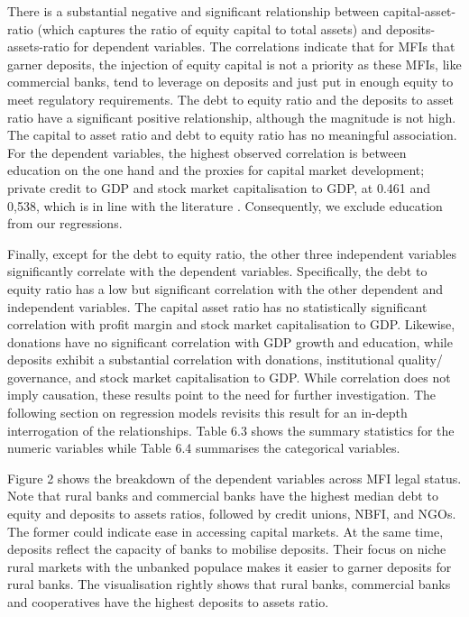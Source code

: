 \documentclass[a4paper, nobind]{templates/ociamthesis}
\begin{document}
There is a substantial negative and significant relationship between capital-asset-ratio (which captures the ratio of equity capital to total assets) and deposits-assets-ratio for dependent variables. The correlations indicate that for MFIs that garner deposits, the injection of equity capital is not a priority as these MFIs, like commercial banks, tend to leverage on deposits and just put in enough equity to meet regulatory requirements. The debt to equity ratio and the deposits to asset ratio have a significant positive relationship, although the magnitude is not high. The capital to asset ratio and debt to equity ratio has no meaningful association. For the dependent variables, the highest observed correlation is between education on the one hand and the proxies for capital market development; private credit to GDP and stock market capitalisation to GDP, at 0.461 and 0,538, which is in line with the literature \autocite{allen2013resolving,allen2014african}. Consequently, we exclude education from our regressions.

Finally, except for the debt to equity ratio, the other three independent variables significantly correlate with the dependent variables. Specifically, the debt to equity ratio has a low but significant correlation with the other dependent and independent variables. The capital asset ratio has no statistically significant correlation with profit margin and stock market capitalisation to GDP. Likewise, donations have no significant correlation with GDP growth and education, while deposits exhibit a substantial correlation with donations, institutional quality/ governance, and stock market capitalisation to GDP. While correlation does not imply causation, these results point to the need for further investigation. The following section on regression models revisits this result for an in-depth interrogation of the relationships. Table 6.3 shows the summary statistics for the numeric variables while Table 6.4 summarises the categorical variables.

Figure 2 shows the breakdown of the dependent variables across MFI legal status. Note that rural banks and commercial banks have the highest median debt to equity and deposits to assets ratios, followed by credit unions, NBFI, and NGOs. The former could indicate ease in accessing capital markets. At the same time, deposits reflect the capacity of banks to mobilise deposits. Their focus on niche rural markets with the unbanked populace makes it easier to garner deposits for rural banks. The visualisation rightly shows that rural banks, commercial banks and cooperatives have the highest deposits to assets ratio.
\end{document}
